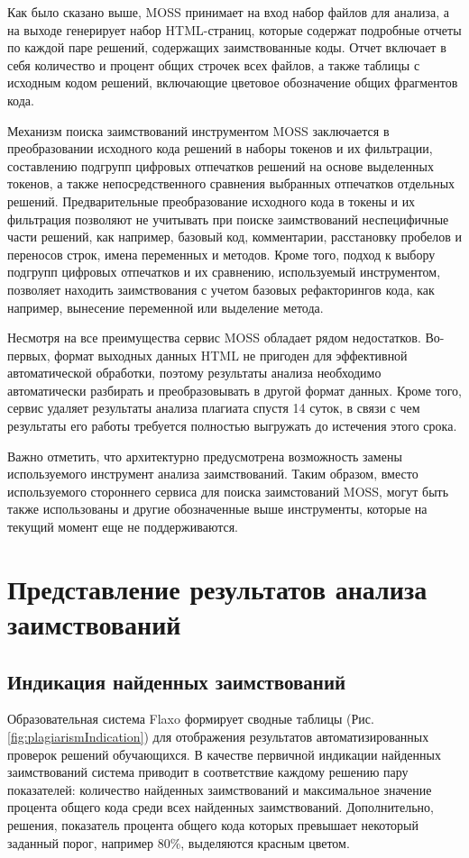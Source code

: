 \documentclass[a4paper,14pt]{extarticle}
\begin{document}
Как было сказано выше, MOSS принимает на вход набор файлов для анализа, а на выходе генерирует набор HTML-страниц, которые содержат подробные отчеты по каждой паре решений, содержащих заимствованные коды. Отчет включает в себя количество и процент общих строчек всех файлов, а также таблицы с исходным кодом решений, включающие цветовое обозначение общих фрагментов кода.

Механизм поиска заимствований инструментом MOSS заключается в преобразовании исходного кода решений в наборы токенов и их фильтрации, составлению подгрупп цифровых отпечатков решений на основе выделенных токенов, а также непосредственного сравнения выбранных отпечатков отдельных решений. Предварительные преобразование исходного кода в токены и их фильтрация позволяют не учитывать при поиске заимствований неспецифичные части решений, как например, базовый код, комментарии, расстановку пробелов и переносов строк, имена переменных и методов. Кроме того, подход к выбору подгрупп цифровых отпечатков и их сравнению, используемый инструментом, позволяет находить заимствования с учетом базовых рефакторингов кода, как например, вынесение переменной или выделение метода.

Несмотря на все преимущества сервис MOSS обладает рядом недостатков. Во-первых, формат выходных данных HTML не пригоден для эффективной автоматической обработки, поэтому результаты анализа необходимо автоматически разбирать и преобразовывать в другой формат данных. Кроме того, сервис удаляет результаты анализа плагиата спустя 14 суток, в связи с чем результаты его работы требуется полностью выгружать до истечения этого срока.

Важно отметить, что архитектурно предусмотрена возможность замены используемого инструмент анализа заимствований. Таким образом, вместо используемого стороннего сервиса для поиска заимстований MOSS, могут быть также использованы и другие обозначенные выше инструменты, которые на текущий момент еще не поддерживаются.

\section{Представление результатов анализа заимствований}

\subsection{Индикация найденных заимствований}

Образовательная система Flaxo формирует сводные таблицы (Рис. \ref{fig:plagiarismIndication}) для отображения результатов автоматизированных проверок решений обучающихся. В качестве первичной индикации найденных заимствований система приводит в соответствие каждому решению пару показателей: количество найденных заимствований и максимальное значение процента общего кода среди всех найденных заимствований. Дополнительно, решения, показатель процента общего кода которых превышает некоторый заданный порог, например 80\%, выделяются красным цветом.
\end{document}
